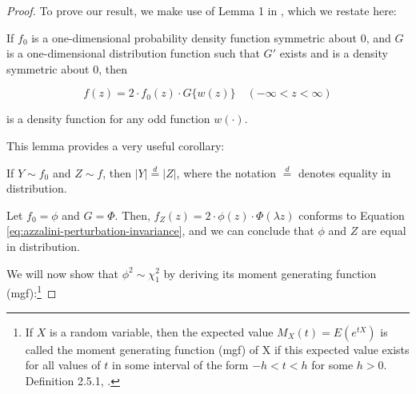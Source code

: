 \documentclass{article}
\begin{document}
\begin{proof}
  To prove our result, we make use of Lemma 1 in \citet{azzalini}, which we
  restate here:

  \begin{helper-lem}
    If $f_0$ is a one-dimensional probability density function symmetric about
    0, and $G$ is a one-dimensional distribution function such that $G'$ exists
    and is a density symmetric about 0, then

    \begin{equation}
      \label{eq:azzalini-perturbation-invariance}
      f(z) = 2 \cdot f_0(z) \cdot G\{w(z)\} \quad (-\infty < z < \infty)
    \end{equation}

    is a density function for any odd function $w(\cdot)$.
  \end{helper-lem}

  This lemma provides a very useful corollary:

  \begin{helper-cor}
    If $Y \sim f_0$ and $Z \sim f$, then $|Y| \overset{d}{=} |Z|$, where the
    notation $\overset{d}{=}$ denotes equality in distribution.    
  \end{helper-cor}

  Let $f_0 = \phi$ and $G = \Phi$. Then, $f_Z(z) = 2 \cdot \phi(z) \cdot
  \Phi(\lambda z)$ conforms to Equation
  \eqref{eq:azzalini-perturbation-invariance}, and we can conclude that $\phi$
  and $Z$ are equal in distribution.

  We will now show that $\phi^2 \sim \chi^2_1$ by deriving its moment
  generating function (mgf):\footnote{If $X$ is a random variable, then the
  expected value $M_X(t) = E(e^{tX})$ is called the moment generating function
  (mgf) of X if this expected value exists for all values of $t$ in some
  interval of the form $-h < t < h$ for some $h > 0$. Definition 2.5.1,
  \citet{textbook}.}


\end{proof}
\end{document}
